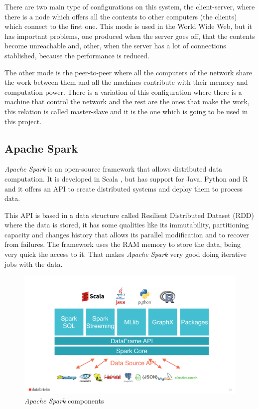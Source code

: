 There are two main type of configurations on this system, the client-server, where there is a node which offers all the contents to other computers (the clients) which connect to the first one. This mode is used in the World Wide Web, but it has important problems, one produced when the server goes off, that the contents become unreachable and, other, when the server has a lot of connections stablished, because the performance is reduced.

The other mode is the peer-to-peer where all the computers of the network share the work between them and all the machines contribute with their memory and computation power. There is a variation of this configuration where there is a machine that control the network and the rest are the ones that make the work, this relation is called master-slave and it is the one which is going to be used in this project.

\subsection{Apache Spark}
\textit{Apache Spark} \cite{spark} is an open-source \gls{framework} that allows distributed data computation. It is developed in Scala \cite{scala}, but has support for Java, Python and R and it offers an \gls{API} to create distributed systems and deploy them to process data.

This \gls{API} is based in a data structure called Resilient Distributed Dataset (\gls{RDD}) where the data is stored, it has some qualities like its immutability, partitioning capacity and changes history that allows its parallel modification and to recover from failures. The framework uses the \gls{RAM} memory to store the data, being very quick the access to it. That makes \textit{Apache Spark} very good doing iterative jobs with the data.

\begin{figure}[htp!]
	\centering
	\caption{\textit{Apache Spark} components \cite{partsSpark}}
	\label{partSparkEng}
	\vspace{5pt}
	\includegraphics[scale=0.31]{graphics/partSpark}
\end{figure}

